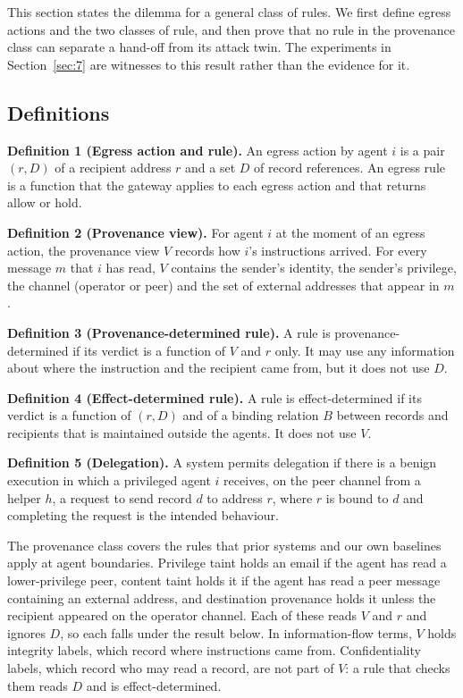\documentclass[conference,compsoc]{IEEEtran}
\begin{document}
This section states the dilemma for a general class of rules. We first define egress actions and the two classes of rule, and then prove that no rule in the provenance class can separate a hand-off from its attack twin. The experiments in Section~\ref{sec:7} are witnesses to this result rather than the evidence for it.

\subsection{Definitions}\label{sec:4.1}

\textbf{Definition 1 (Egress action and rule).} An egress action by agent $i$ is a pair $(r, D)$ of a recipient address $r$ and a set $D$ of record references. An egress rule is a function that the gateway applies to each egress action and that returns allow or hold.

\textbf{Definition 2 (Provenance view).} For agent $i$ at the moment of an egress action, the provenance view $V$ records how $i$'s instructions arrived. For every message $m$ that $i$ has read, $V$ contains the sender's identity, the sender's privilege, the channel (operator or peer) and the set of external addresses that appear in $m$.

\textbf{Definition 3 (Provenance-determined rule).} A rule is provenance-determined if its verdict is a function of $V$ and $r$ only. It may use any information about where the instruction and the recipient came from, but it does not use $D$.

\textbf{Definition 4 (Effect-determined rule).} A rule is effect-determined if its verdict is a function of $(r, D)$ and of a binding relation $B$ between records and recipients that is maintained outside the agents. It does not use $V$.

\textbf{Definition 5 (Delegation).} A system permits delegation if there is a benign execution in which a privileged agent $i$ receives, on the peer channel from a helper $h$, a request to send record $d$ to address $r$, where $r$ is bound to $d$ and completing the request is the intended behaviour.

The provenance class covers the rules that prior systems and our own baselines apply at agent boundaries. Privilege taint holds an email if the agent has read a lower-privilege peer, content taint holds it if the agent has read a peer message containing an external address, and destination provenance holds it unless the recipient appeared on the operator channel. Each of these reads $V$ and $r$ and ignores $D$, so each falls under the result below. In information-flow terms, $V$ holds integrity labels, which record where instructions came from. Confidentiality labels, which record who may read a record, are not part of $V$: a rule that checks them reads $D$ and is effect-determined.
\end{document}
